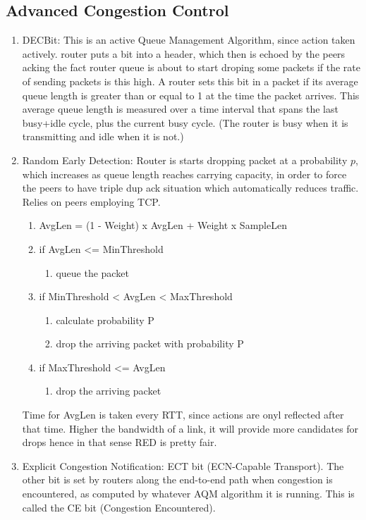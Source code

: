 \documentclass[12pt]{book}
\begin{document}
\subsection{Advanced Congestion Control}
\begin{enumerate}
    \item DECBit: This is an active Queue Management Algorithm, since action taken actively. router puts a bit into a header, which then is echoed by the peers acking the fact router queue is about to start droping some packets if the rate of sending packets is this high. A router sets this bit in a packet if its average queue length is greater than or equal to 1 at the time the packet arrives. This average queue length is measured over a time interval that spans the last busy+idle cycle, plus the current busy cycle. (The router is busy when it is transmitting and idle when it is not.)
    \item Random Early Detection: Router is starts dropping packet at a probability $p$, which increases as queue length reaches carrying capacity, in order to force the peers to have triple dup ack situation which automatically reduces traffic. Relies on peers employing TCP.
    \begin{enumerate}
    \item AvgLen = (1 - Weight) x AvgLen + Weight x SampleLen
        \item if AvgLen <= MinThreshold
        \begin{enumerate}
            \item queue the packet
        \end{enumerate}
    \item if MinThreshold < AvgLen < MaxThreshold
    \begin{enumerate}
        \item calculate probability P
        \item drop the arriving packet with probability P
    \end{enumerate}
    \item if MaxThreshold <= AvgLen
    \begin{enumerate}
        \item drop the arriving packet
    \end{enumerate}
    \end{enumerate}
    Time for AvgLen is taken every RTT, since actions are onyl reflected after that time.
    Higher the bandwidth of a link, it will provide more candidates for drops hence in that sense RED is pretty fair.
    \item Explicit Congestion Notification: ECT bit (ECN-Capable Transport). The other bit is set by routers along the end-to-end path when congestion is encountered, as computed by whatever AQM algorithm it is running. This is called the CE bit (Congestion Encountered).
    

\end{enumerate}
\end{document}

